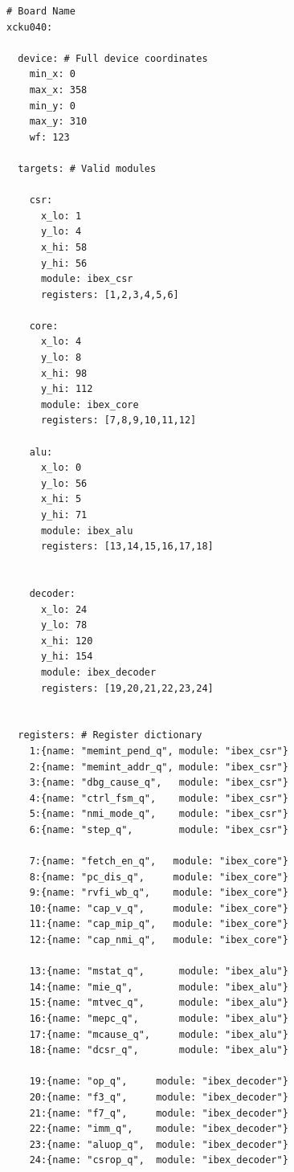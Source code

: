 \begingroup
\setlength{\columnsep}{28pt}     %
\begin{multicols}{2}
\raggedcolumns

\begin{lstlisting}[language=simpleyaml,style=yamlcompact,breaklines=true,aboveskip=4pt,belowskip=0pt]
# Board Name
xcku040:

  device: # Full device coordinates
    min_x: 0
    max_x: 358
    min_y: 0
    max_y: 310
    wf: 123

  targets: # Valid modules
  
    csr:
      x_lo: 1
      y_lo: 4
      x_hi: 58
      y_hi: 56
      module: ibex_csr
      registers: [1,2,3,4,5,6]
      
    core:
      x_lo: 4
      y_lo: 8
      x_hi: 98
      y_hi: 112
      module: ibex_core
      registers: [7,8,9,10,11,12]
      
    alu:
      x_lo: 0
      y_lo: 56
      x_hi: 5
      y_hi: 71
      module: ibex_alu
      registers: [13,14,15,16,17,18]

      
    decoder:
      x_lo: 24
      y_lo: 78
      x_hi: 120
      y_hi: 154
      module: ibex_decoder
      registers: [19,20,21,22,23,24]


  registers: # Register dictionary 
    1:{name: "memint_pend_q", module: "ibex_csr"}
    2:{name: "memint_addr_q", module: "ibex_csr"}
    3:{name: "dbg_cause_q",   module: "ibex_csr"}
    4:{name: "ctrl_fsm_q",    module: "ibex_csr"}
    5:{name: "nmi_mode_q",    module: "ibex_csr"}
    6:{name: "step_q",        module: "ibex_csr"}

    7:{name: "fetch_en_q",   module: "ibex_core"}
    8:{name: "pc_dis_q",     module: "ibex_core"}
    9:{name: "rvfi_wb_q",    module: "ibex_core"}
    10:{name: "cap_v_q",     module: "ibex_core"}
    11:{name: "cap_mip_q",   module: "ibex_core"}
    12:{name: "cap_nmi_q",   module: "ibex_core"}

    13:{name: "mstat_q",      module: "ibex_alu"}
    14:{name: "mie_q",        module: "ibex_alu"}
    15:{name: "mtvec_q",      module: "ibex_alu"}
    16:{name: "mepc_q",       module: "ibex_alu"}
    17:{name: "mcause_q",     module: "ibex_alu"}
    18:{name: "dcsr_q",       module: "ibex_alu"}

    19:{name: "op_q",     module: "ibex_decoder"}
    20:{name: "f3_q",     module: "ibex_decoder"}
    21:{name: "f7_q",     module: "ibex_decoder"}
    22:{name: "imm_q",    module: "ibex_decoder"}
    23:{name: "aluop_q",  module: "ibex_decoder"}
    24:{name: "csrop_q",  module: "ibex_decoder"}
\end{lstlisting}

\end{multicols}
\endgroup